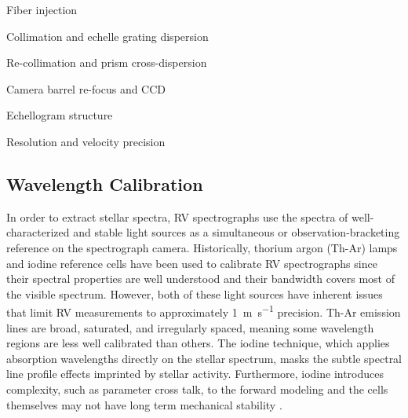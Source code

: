 Fiber injection

Collimation and echelle grating dispersion

Re-collimation and prism cross-dispersion

Camera barrel re-focus and CCD

Echellogram structure

Resolution and velocity precision

\subsection{Wavelength Calibration} \label{intro:wvln_cal}

In order to extract stellar spectra, RV spectrographs use the spectra of well-characterized and stable light sources as a simultaneous or observation-bracketing reference on the spectrograph camera. Historically, thorium argon (Th-Ar) lamps and iodine reference cells have been used to calibrate RV spectrographs since their spectral properties are well understood and their bandwidth covers most of the visible spectrum. However, both of these light sources have inherent issues that limit RV measurements to approximately \SI{1}{\meter\per\second} precision. Th-Ar emission lines are broad, saturated, and irregularly spaced, meaning some wavelength regions are less well calibrated than others. The iodine technique, which applies absorption wavelengths directly on the stellar spectrum, masks the subtle spectral line profile effects imprinted by stellar activity. Furthermore, iodine introduces complexity, such as parameter cross talk, to the forward modeling \citep{spronck_fiber_2015} and the cells themselves may not have long term mechanical stability \citep{fischer_twenty-five_2014}.

